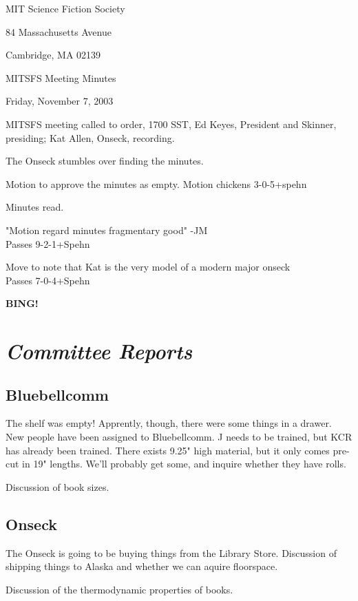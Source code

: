 \documentclass[10pt]{article}
\newcommand{\bing}{{\bf BING!} }
\newcommand{\goto}[1]{\bing \vskip 12pt \section*{{\em{#1}}}}
\begin{document}
\begin{center}

MIT Science Fiction Society 

84 Massachusetts Avenue

Cambridge, MA 02139

\vspace{12pt}

MITSFS Meeting Minutes 

Friday, November 7, 2003

\end{center}
 
\vspace{18pt}

\setlength{\parskip}{6pt}

\noindent
MITSFS meeting called to order, 1700 SST, Ed Keyes, President and
Skinner, presiding; Kat Allen,  Onseck, recording.

The Onseck stumbles over finding the minutes.

Motion to approve the minutes as empty.
Motion chickens 3-0-5+spehn

Minutes read.


"Motion regard minutes fragmentary good" -JM\\
Passes 9-2-1+Spehn

Move to note that Kat is the very model of a modern major onseck\\
Passes 7-0-4+Spehn

\goto{Committee Reports}

\subsection*{Bluebellcomm}
The shelf was empty!  Apprently, though, there were some things in a drawer.
New people have been assigned to Bluebellcomm.
J needs to be trained, but KCR has already been trained.
There exists 9.25" high material, but it only comes pre-cut in 19" lengths.
We'll probably get some, and inquire whether they have rolls.

Discussion of book sizes.

\subsection*{Onseck}
The Onseck is going to be buying things from the Library Store. 
Discussion of shipping things to Alaska and whether we can aquire
floorspace.

Discussion of the thermodynamic properties of books.
\end{document}
